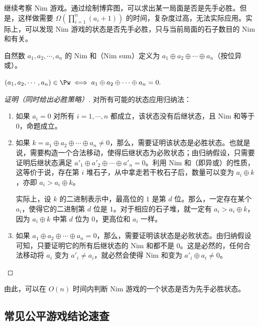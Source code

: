 \newpage

继续考察 Nim 游戏。通过绘制博弈图，可以求出某一局面是否是先手必胜。但是，这样做需要 $\Omega\!\left(\prod_{i=1}^n(a_i+1)\right)$ 的时间，复杂度过高，无法实际应用。实际上，可以发现 Nim 游戏的状态是否先手必胜，只与当前局面的石子数目的 Nim 和有关。

\begin{definition}[Nim 和]
	自然数 $a_1,a_2,\cdots,a_n$ 的 Nim 和（Nim sum）定义为 $a_1\oplus a_2\oplus\cdots\oplus a_n$（按位异或）。
\end{definition}

\begin{theorem}
	$ (a_1,a_2,\cdots,a_n)\in\Pw \iff a_1\oplus a_2\oplus\cdots\oplus a_n=0. $
\end{theorem}

\begin{proof}[证明（同时给出必胜策略）]
	
	对所有可能的状态应用归纳法：
	
	\begin{enumerate}
		\item 如果 $a_i=0$ 对所有 $i=1,\cdots,n$ 都成立，该状态没有后继状态，且 Nim 和等于 $0$，命题成立。
		
		\item 如果 $k = a_1\oplus a_2\oplus\cdots\oplus a_n\neq 0$，那么，需要证明该状态是必胜状态。也就是说，需要构造一个合法移动，使得后继状态为必败状态；由归纳假设，只需要证明后继状态满足 $a'_1\oplus a'_2\oplus\cdots\oplus a'_n=0$。利用 Nim 和（即异或）的性质，这等价于说，存在第 $i$ 堆石子，从中拿走若干枚石子后，数量可以变为 $a_i\oplus k$，亦即 $a_i>a_i\oplus k$。
		
		实际上，设 $k$ 的二进制表示中，最高位的 $1$ 是第 $d$ 位。那么，一定存在某个 $a_i$，使得它的二进制第 $d$ 位是 $1$。对于相应的石子堆，就一定有 $a_i>a_i\oplus k$，因为 $a_i\oplus k$ 中第 $d$ 位为 $0$，更高位和 $a_i$ 一样。
		
		\item 如果 $a_1\oplus a_2\oplus\cdots\oplus a_n= 0$，那么，需要证明该状态是必败状态。由归纳假设可知，只要证明它的所有后继状态的 Nim 和都不是 $0$。这是必然的，任何合法移动将 $a_i$ 变为 $a'_i\neq a_i$，就必然会使得 Nim 和变为 $a'_i\oplus a_i\neq 0$。
	\end{enumerate}
\end{proof}

由此，可以在 $O(n)$ 时间内判断 Nim 游戏的一个状态是否为先手必胜状态。

\subsection{常见公平游戏结论速查}

